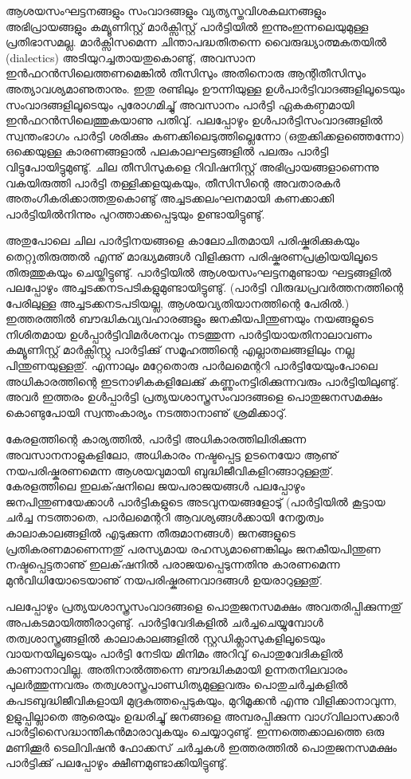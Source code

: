 ﻿
\vskip 2pt

ആശയസംഘട്ടനങ്ങളും സംവാദങ്ങളും വ്യത്യസ്തവിശകലനങ്ങളും അഭിപ്രായങ്ങളും കമ്യൂണിസ്റ്റ് മാര്‍ക്സിസ്റ്റ് പാര്‍ട്ടിയില്‍ 
ഇന്നുംഇന്നലെയുമുള്ള പ്രതിഭാസമല്ല. മാര്‍ക്സിസമെന്ന ചിന്താപദ്ധതിതന്നെ വൈരുദ്ധ്യാത്മകതയില്‍ (dialectics) 
അടിയുറച്ചതായതുകൊണ്ടു്, അവസാന ഇന്‍ഫറന്‍സിലെത്തണമെങ്കില്‍ തീസിസും അതിനൊരു ആന്റിതീസിസും 
അത്യാവശ്യമാണുതാനും. ഇതു രണ്ടിലും ഊന്നിയുള്ള ഉള്‍പാര്‍ട്ടിവാദങ്ങളിലൂടെയും സംവാദങ്ങളിലൂടെയും പുരോഗമിച്ചു് 
അവസാനം പാര്‍ട്ടി ഏകകണ്ഠമായി ഇന്‍ഫറന്‍സിലെത്തുകയാണു പതിവു്. പലപ്പോഴും ഉള്‍പാര്‍ട്ടിസംവാദങ്ങളില്‍ സ്വന്തംഭാഗം 
പാര്‍ട്ടി ശരിക്കും കണക്കിലെടുത്തില്ലെന്നോ (ഒതുക്കിക്കളഞ്ഞെന്നോ) ഒക്കെയുള്ള കാരണങ്ങളാല്‍ 
പലകാലഘട്ടങ്ങളില്‍ പലരും പാര്‍ട്ടി വിട്ടുപോയിട്ടുമുണ്ടു്. ചില തീസിസുകളെ റിവിഷനിസ്റ്റ് അഭിപ്രായങ്ങളാണെന്നു 
വകയിരുത്തി പാര്‍ട്ടി തള്ളിക്കളയുകയും, തീസിസിന്റെ അവതാരകര്‍ അതംഗീകരിക്കാത്തതുകൊണ്ടു് 
അച്ചടക്കലംഘനമായി കണക്കാക്കി പാര്‍ട്ടിയില്‍നിന്നും പുറത്താക്കപ്പെടുയും ഉണ്ടായിട്ടുണ്ടു്.

അതുപോലെ ചില പാര്‍ട്ടിനയങ്ങളെ കാലോചിതമായി പരിഷ്കരിക്കുകയും തെറ്റുതിരുത്തല്‍ എന്നു് മാദ്ധ്യമങ്ങള്‍ വിളിക്കുന്ന 
പരിഷ്കരണപ്രക്രിയയിലൂടെ തിരുത്തുകയും ചെയ്തിട്ടുണ്ടു്. പാര്‍ട്ടിയില്‍ ആശയസംഘട്ടനമുണ്ടായ ഘട്ടങ്ങളില്‍ പലപ്പോഴും 
അച്ചടക്കനടപടികളുമുണ്ടായിട്ടുണ്ടു്. (പാര്‍ട്ടി വിരുദ്ധപ്രവര്‍ത്തനത്തിന്റെ പേരിലുള്ള അച്ചടക്കനടപടിയല്ല, 
ആശയവ്യതിയാനത്തിന്റെ പേരില്‍.) ഇത്തരത്തില്‍ ബൗദ്ധികവ്യവഹാരങ്ങളും ജനകീയപിന്തുണയും നയങ്ങളുടെ 
നിശിതമായ ഉള്‍പ്പാര്‍ട്ടിവിമര്‍ശനവും നടത്തുന്ന പാര്‍ട്ടിയായതിനാലാവണം കമ്യൂണിസ്റ്റ് മാര്‍ക്സിസ്റ്റു പാര്‍ട്ടിക്കു് 
സമൂഹത്തിന്റെ എല്ലാതലങ്ങളിലും നല്ല പിന്തുണയുള്ളതു്. എന്നാലും മറ്റേതൊരു പാര്‍ലമെന്ററി പാര്‍ട്ടിയേയുംപോലെ 
അധികാരത്തിന്റെ ഇടനാഴികകളിലേക്കു് കണ്ണുംനട്ടിരിക്കുന്നവരും പാര്‍ട്ടിയിലുണ്ടു്. അവര്‍ ഇത്തരം ഉള്‍പ്പാര്‍ട്ടി 
പ്രത്യയശാസ്ത്രസംവാദങ്ങളെ പൊതുജനസമക്ഷം കൊണ്ടുപോയി സ്വന്തംകാര്യം നടത്താനാണു് ശ്രമിക്കാറു്.

കേരളത്തിന്റെ കാര്യത്തില്‍, പാര്‍ട്ടി അധികാരത്തിലിരിക്കുന്ന അവസാനനാളുകളിലോ, അധികാരം നഷ്ടപ്പെട്ട 
ഉടനെയോ ആണു് നയപരിഷ്കരണമെന്ന ആശയവുമായി ബുദ്ധിജീവികളിറങ്ങാറുള്ളതു്. കേരളത്തിലെ ഇലക്‌ഷനിലെ 
ജയപരാജയങ്ങള്‍ പലപ്പോഴും ജനപിന്തുണയേക്കാള്‍ പാര്‍ട്ടികളുടെ അടവുനയങ്ങളോടു് (പാര്‍ട്ടിയില്‍ കൂട്ടായ ചര്‍ച്ച 
നടത്താതെ, പാര്‍ലമെന്ററി ആവശ്യങ്ങള്‍ക്കായി നേതൃത്വം കാലാകാലങ്ങളില്‍ എടുക്കുന്ന തീരുമാനങ്ങള്‍) ജനങ്ങളുടെ 
പ്രതികരണമാണെന്നതു് പരസ്യമായ രഹസ്യമാണെങ്കിലും ജനകീയപിന്തുണ നഷ്ടപ്പെട്ടതാണു് ഇലക്‌ഷനില്‍ 
പരാജയപ്പെടുന്നതിനു കാരണമെന്ന മുന്‍വിധിയോടെയാണു് നയപരിഷ്കരണവാദങ്ങള്‍ ഉയരാറുള്ളതു്.

പലപ്പോഴും പ്രത്യയശാസ്ത്രസംവാദങ്ങളെ പൊതുജനസമക്ഷം അവതരിപ്പിക്കുന്നതു് അപകടമായിത്തീരാറുണ്ടു്. 
പാര്‍ട്ടിവേദികളില്‍ ചര്‍ച്ചചെയ്യുമ്പോള്‍ തത്വശാസ്ത്രങ്ങളില്‍ കാലാകാലങ്ങളില്‍ സ്റ്റഡിക്ലാസുകളിലൂടെയും 
വായനയിലൂടെയും പാര്‍ട്ടി നേടിയ മിനിമം അറിവു് പൊതുവേദികളില്‍ കാണാനാവില്ല. അതിനാല്‍ത്തന്നെ ബൗദ്ധികമായി 
ഉന്നതനിലവാരം പുലര്‍ത്തുന്നവരും തത്വശാസ്ത്രപാണ്ഡിത്യമുള്ളവരും പൊതുചര്‍ച്ചകളില്‍ കപടബുദ്ധിജീവികളായി 
മുദ്രകുത്തപ്പെടുകയും, മുറിമൂക്കന്‍ എന്നു വിളിക്കാനാവുന്ന, ഉളുപ്പില്ലാതെ ആരെയും ഉദ്ധരിച്ചു് ജനങ്ങളെ അമ്പരപ്പിക്കുന്ന 
വാഗ്‌വിലാസക്കാര്‍ പാര്‍ട്ടിസൈദ്ധാന്തികന്‍മാരാവുകയും ചെയ്യാറുണ്ടു്. ഇന്നത്തെക്കാലത്തെ ഒരു മണിക്കൂര്‍ 
ടെലിവിഷന്‍ ഫോക്കസ് ചര്‍ച്ചകള്‍ ഇത്തരത്തില്‍ പൊതുജനസമക്ഷം പാര്‍ട്ടിക്കു് പലപ്പോഴും ക്ഷീണമുണ്ടാക്കിയിട്ടുണ്ടു്.

